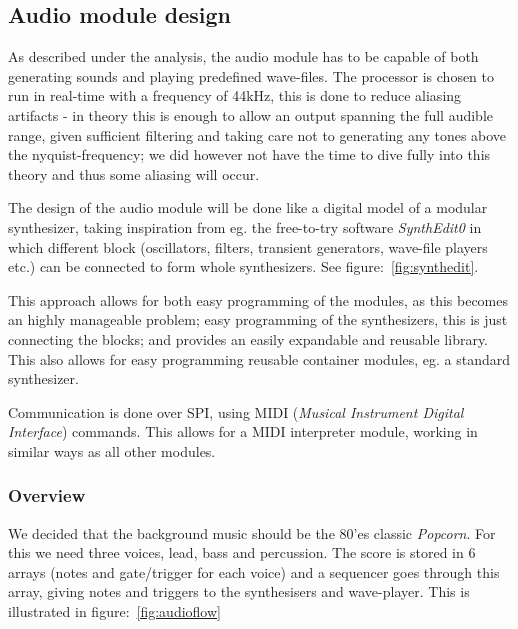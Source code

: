 \subsection{Audio module design}

As described under the analysis, the audio module has to be capable of both
generating sounds and playing predefined wave-files. The processor is chosen to
run in real-time with a frequency of 44kHz, this is done to reduce aliasing
artifacts - in theory this is enough to allow an output spanning the full
audible range, given sufficient filtering and taking care not to generating any
tones above the nyquist-frequency; we did however not have the time to dive
fully into this theory and thus some aliasing will occur.

The design of the audio module will be done like a digital model of a modular
synthesizer, taking inspiration from eg. the free-to-try software
\emph{SynthEdit0} in which different block (oscillators, filters, transient
generators, wave-file players etc.) can be connected to form whole synthesizers.
See figure:~\ref{fig:synthedit}.


This approach allows for both easy programming of the modules, as this becomes
an highly manageable problem; easy programming of the synthesizers, this is just
connecting the blocks; and provides an easily expandable and reusable library.
This also allows for easy programming reusable container modules, eg. a
standard synthesizer.

Communication is done over SPI, using MIDI (\emph{Musical Instrument Digital
Interface}) commands. This allows for a MIDI interpreter module, working in
similar ways as all other modules.

\subsubsection{Overview}
We decided that the background music should be the 80'es classic
\emph{Popcorn}.
For this we need three voices, lead, bass and percussion.
The score is stored in 6 arrays (notes and gate/trigger for each voice) and a
sequencer goes through this array, giving notes and triggers to the synthesisers
and wave-player. This is illustrated in figure:~\ref{fig:audioflow}

